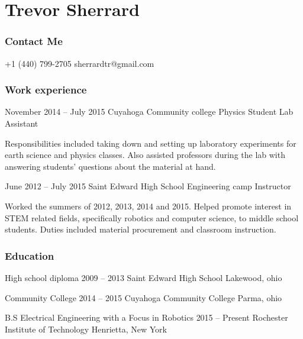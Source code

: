 \documentclass{tccv}
\begin{document}
\part{Trevor Sherrard}
\section{Contact Me}
\begin{eventlist}
    {+1 (440) 799-2705}
    {sherrardtr@gmail.com}
\end{eventlist}

\section{Work experience}

\begin{eventlist}

\item{November 2014 -- July 2015}
     {Cuyahoga Community college}
     {Physics Student Lab Assistant }

Responsibilities included taking down and setting up laboratory experiments for earth science and physics classes. Also assisted professors during the lab with answering students' questions about the material at hand.

\item{June 2012 -- July 2015}
     {Saint Edward High School}
     {Engineering camp Instructor}
     
Worked the summers of 2012, 2013, 2014 and 2015. Helped promote interest in STEM related fields, specifically robotics and computer science, to middle school students. Duties included material procurement and classroom instruction.
\end{eventlist}

\section{Education}

\begin{yearlist}

\item[High school diploma]{2009 -- 2013}
     {Saint Edward High School}
     {Lakewood, ohio}

\item[Community College]{2014 -- 2015}
     {Cuyahoga Community College}
     {Parma, ohio}

\item[B.S Electrical Engineering with a Focus in Robotics]{2015 -- Present}
     {Rochester Institute of Technology}
     {Henrietta, New York}

\end{yearlist}
\newline
\newline
\newline
\newline
\newline
\newline
\newline
\end{document}
